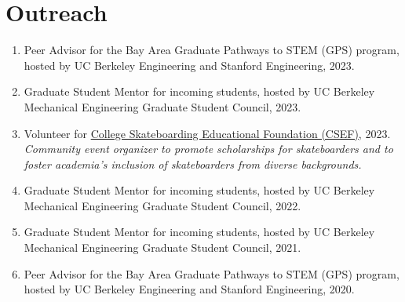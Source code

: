 \documentclass[11pt]{article}
\begin{document}
	\section{Outreach}
	\begin{enumerate}[label={\arabic*.}]
		\item Peer Advisor for the Bay Area Graduate Pathways to STEM (GPS) program, hosted by UC Berkeley Engineering and Stanford Engineering, 2023.
		\item Graduate Student Mentor for incoming students, hosted by UC Berkeley Mechanical Engineering Graduate Student Council, 2023.
		\item Volunteer for \href{https://www.collegeskateboarding.com/}{College Skateboarding Educational Foundation (CSEF)}, 2023. \\
		\textit{Community event organizer to promote scholarships for skateboarders and to foster academia's inclusion of skateboarders from diverse backgrounds.}
		\item Graduate Student Mentor for incoming students, hosted by UC Berkeley Mechanical Engineering Graduate Student Council, 2022.
		\item Graduate Student Mentor for incoming students, hosted by UC Berkeley Mechanical Engineering Graduate Student Council, 2021.
		\item Peer Advisor for the Bay Area Graduate Pathways to STEM (GPS) program, hosted by UC Berkeley Engineering and Stanford Engineering, 2020.
	\end{enumerate}
	
\end{document}
